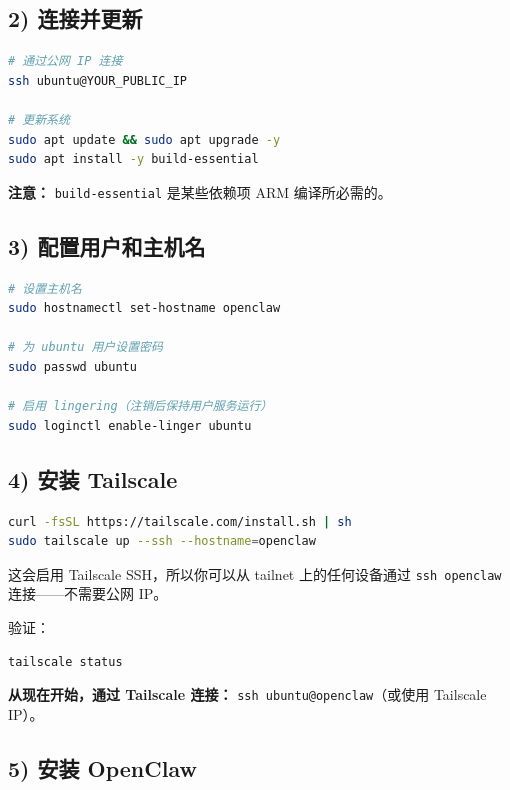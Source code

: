 \subsection{2) 连接并更新}


\begin{lstlisting}[language=bash]
# 通过公网 IP 连接
ssh ubuntu@YOUR_PUBLIC_IP

# 更新系统
sudo apt update && sudo apt upgrade -y
sudo apt install -y build-essential
\end{lstlisting}


\textbf{注意：} \texttt{build-essential} 是某些依赖项 ARM 编译所必需的。

\subsection{3) 配置用户和主机名}


\begin{lstlisting}[language=bash]
# 设置主机名
sudo hostnamectl set-hostname openclaw

# 为 ubuntu 用户设置密码
sudo passwd ubuntu

# 启用 lingering（注销后保持用户服务运行）
sudo loginctl enable-linger ubuntu
\end{lstlisting}


\subsection{4) 安装 Tailscale}


\begin{lstlisting}[language=bash]
curl -fsSL https://tailscale.com/install.sh | sh
sudo tailscale up --ssh --hostname=openclaw
\end{lstlisting}


这会启用 Tailscale SSH，所以你可以从 tailnet 上的任何设备通过 \texttt{ssh openclaw} 连接——不需要公网 IP。

验证：

\begin{lstlisting}[language=bash]
tailscale status
\end{lstlisting}


\textbf{从现在开始，通过 Tailscale 连接：} \texttt{ssh ubuntu@openclaw}（或使用 Tailscale IP）。

\subsection{5) 安装 OpenClaw}


